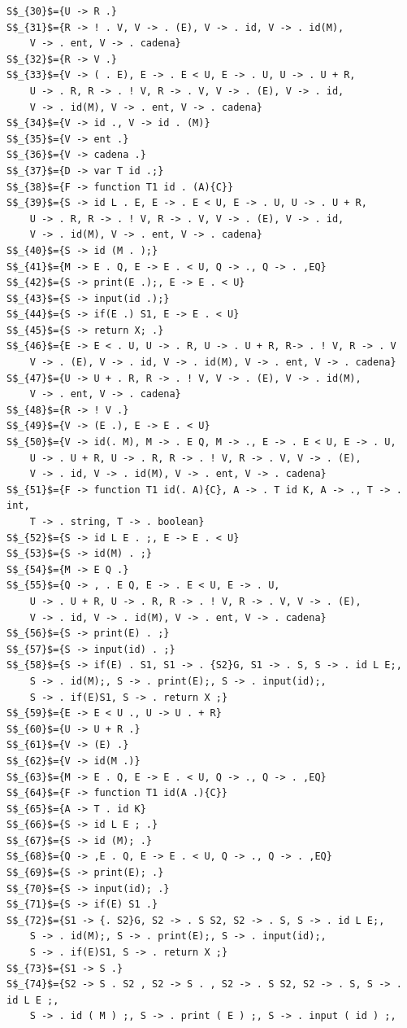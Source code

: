 \documentclass[a4paper, 12pt]{article}
\begin{document}
\begin{lstlisting}
S$_{30}$={U -> R .}
S$_{31}$={R -> ! . V, V -> . (E), V -> . id, V -> . id(M), 
	V -> . ent, V -> . cadena}
S$_{32}$={R -> V .}
S$_{33}$={V -> ( . E), E -> . E < U, E -> . U, U -> . U + R,
	U -> . R, R -> . ! V, R -> . V, V -> . (E), V -> . id,
	V -> . id(M), V -> . ent, V -> . cadena}
S$_{34}$={V -> id ., V -> id . (M)}
S$_{35}$={V -> ent .}
S$_{36}$={V -> cadena .}
S$_{37}$={D -> var T id .;}
S$_{38}$={F -> function T1 id . (A){C}}
S$_{39}$={S -> id L . E, E -> . E < U, E -> . U, U -> . U + R,
	U -> . R, R -> . ! V, R -> . V, V -> . (E), V -> . id,
	V -> . id(M), V -> . ent, V -> . cadena}
S$_{40}$={S -> id (M . );}
S$_{41}$={M -> E . Q, E -> E . < U, Q -> ., Q -> . ,EQ}
S$_{42}$={S -> print(E .);, E -> E . < U}
S$_{43}$={S -> input(id .);}
S$_{44}$={S -> if(E .) S1, E -> E . < U}
S$_{45}$={S -> return X; .}
S$_{46}$={E -> E < . U, U -> . R, U -> . U + R, R-> . ! V, R -> . V
	V -> . (E), V -> . id, V -> . id(M), V -> . ent, V -> . cadena}
S$_{47}$={U -> U + . R, R -> . ! V, V -> . (E), V -> . id(M), 
	V -> . ent, V -> . cadena}
S$_{48}$={R -> ! V .}
S$_{49}$={V -> (E .), E -> E . < U}
S$_{50}$={V -> id(. M), M -> . E Q, M -> ., E -> . E < U, E -> . U, 
	U -> . U + R, U -> . R, R -> . ! V, R -> . V, V -> . (E),
	V -> . id, V -> . id(M), V -> . ent, V -> . cadena}
S$_{51}$={F -> function T1 id(. A){C}, A -> . T id K, A -> ., T -> . int,
	T -> . string, T -> . boolean}
S$_{52}$={S -> id L E . ;, E -> E . < U}
S$_{53}$={S -> id(M) . ;}
S$_{54}$={M -> E Q .}
S$_{55}$={Q -> , . E Q, E -> . E < U, E -> . U, 
	U -> . U + R, U -> . R, R -> . ! V, R -> . V, V -> . (E),
	V -> . id, V -> . id(M), V -> . ent, V -> . cadena}
S$_{56}$={S -> print(E) . ;}
S$_{57}$={S -> input(id) . ;}
S$_{58}$={S -> if(E) . S1, S1 -> . {S2}G, S1 -> . S, S -> . id L E;,
	S -> . id(M);, S -> . print(E);, S -> . input(id);,
	S -> . if(E)S1, S -> . return X ;}
S$_{59}$={E -> E < U ., U -> U . + R}
S$_{60}$={U -> U + R .}
S$_{61}$={V -> (E) .}
S$_{62}$={V -> id(M .)}
S$_{63}$={M -> E . Q, E -> E . < U, Q -> ., Q -> . ,EQ}
S$_{64}$={F -> function T1 id(A .){C}}
S$_{65}$={A -> T . id K}
S$_{66}$={S -> id L E ; .}
S$_{67}$={S -> id (M); .}
S$_{68}$={Q -> ,E . Q, E -> E . < U, Q -> ., Q -> . ,EQ}
S$_{69}$={S -> print(E); .}
S$_{70}$={S -> input(id); .}
S$_{71}$={S -> if(E) S1 .}
S$_{72}$={S1 -> {. S2}G, S2 -> . S S2, S2 -> . S, S -> . id L E;,
	S -> . id(M);, S -> . print(E);, S -> . input(id);,
	S -> . if(E)S1, S -> . return X ;}
S$_{73}$={S1 -> S .}
S$_{74}$={S2 -> S . S2 , S2 -> S . , S2 -> . S S2, S2 -> . S, S -> . id L E ;,
	S -> . id ( M ) ;, S -> . print ( E ) ;, S -> . input ( id ) ;,

\end{lstlisting}
\end{document}
